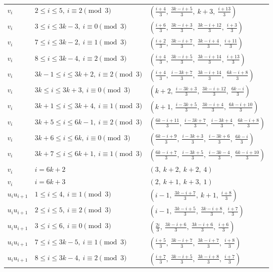 \begin{longtable}{lll}
$v_i$ & $2 \le i \le 5,\ i \equiv 2 \pmod{3}$ & $(\frac{i+4}{3},\ \frac{3k-i+5}{3},\ k+3,\ \frac{i+13}{3})$ \\
$v_i$ & $3 \le i \le 3k-3,\ i \equiv 0 \pmod{3}$ & $(\frac{i+6}{3},\ \frac{3k-i+3}{3},\ \frac{3k-i+12}{3},\ \frac{i+3}{3})$ \\
$v_i$ & $7 \le i \le 3k-2,\ i \equiv 1 \pmod{3}$ & $(\frac{i+2}{3},\ \frac{3k-i+7}{3},\ \frac{3k-i+4}{3},\ \frac{i+11}{3})$ \\
$v_i$ & $8 \le i \le 3k-4,\ i \equiv 2 \pmod{3}$ & $(\frac{i+4}{3},\ \frac{3k-i+5}{3},\ \frac{3k-i+14}{3},\ \frac{i+13}{3})$ \\
$v_i$ & $3k-1 \le i \le 3k+2,\ i \equiv 2 \pmod{3}$ & $(\frac{i+4}{3},\ \frac{i-3k+7}{3},\ \frac{3k-i+14}{3},\ \frac{6k-i+8}{3})$ \\
$v_i$ & $3k \le i \le 3k+3,\ i \equiv 0 \pmod{3}$ & $(k+2,\ \frac{i-3k+3}{3},\ \frac{3k-i+12}{3},\ \frac{6k-i}{3})$ \\
$v_i$ & $3k+1 \le i \le 3k+4,\ i \equiv 1 \pmod{3}$ & $(k+1,\ \frac{i-3k+5}{3},\ \frac{3k-i+4}{3},\ \frac{6k-i+10}{3})$ \\
$v_i$ & $3k+5 \le i \le 6k-1,\ i \equiv 2 \pmod{3}$ & $(\frac{6k-i+11}{3},\ \frac{i-3k+7}{3},\ \frac{i-3k+4}{3},\ \frac{6k-i+8}{3})$ \\
$v_i$ & $3k+6 \le i \le 6k,\ i \equiv 0 \pmod{3}$ & $(\frac{6k-i+9}{3},\ \frac{i-3k+3}{3},\ \frac{i-3k+6}{3},\ \frac{6k-i}{3})$ \\
$v_i$ & $3k+7 \le i \le 6k+1,\ i \equiv 1 \pmod{3}$ & $(\frac{6k-i+7}{3},\ \frac{i-3k+5}{3},\ \frac{i-3k-4}{3},\ \frac{6k-i+10}{3})$ \\
$v_i$ & $i = 6k+2$ & $(3,\ k+2,\ k+2,\ 4)$ \\
$v_i$ & $i = 6k+3$ & $(2,\ k+1,\ k+3,\ 1)$ \\
$u_i u_{i+1}$ & $1 \le i \le 4,\ i \equiv 1 \pmod{3}$ & $(i-1,\ \frac{3k-i+7}{3},\ k+1,\ \frac{i+8}{3})$ \\
$u_i u_{i+1}$ & $2 \le i \le 5,\ i \equiv 2 \pmod{3}$ & $(i-1,\ \frac{3k-i+5}{3},\ \frac{3k-i+8}{3},\ \frac{i+7}{3})$ \\
$u_i u_{i+1}$ & $3 \le i \le 6,\ i \equiv 0 \pmod{3}$ & $(\frac{2i}{3},\ \frac{3k-i+6}{3},\ \frac{3k-i+6}{3},\ \frac{i+6}{3})$ \\
$u_i u_{i+1}$ & $7 \le i \le 3k-5,\ i \equiv 1 \pmod{3}$ & $(\frac{i+5}{3},\ \frac{3k-i+7}{3},\ \frac{3k-i+7}{3},\ \frac{i+8}{3})$ \\
$u_i u_{i+1}$ & $8 \le i \le 3k-4,\ i \equiv 2 \pmod{3}$ & $(\frac{i+7}{3},\ \frac{3k-i+5}{3},\ \frac{3k-i+8}{3},\ \frac{i+7}{3})$ \\

\end{longtable}
